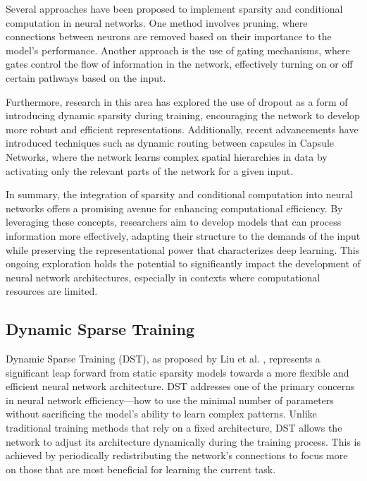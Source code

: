Several approaches have been proposed to implement sparsity and conditional computation in neural networks. One method involves pruning, where connections between neurons are removed based on their importance to the model's performance. Another approach is the use of gating mechanisms, where gates control the flow of information in the network, effectively turning on or off certain pathways based on the input.

Furthermore, research in this area has explored the use of dropout as a form of introducing dynamic sparsity during training, encouraging the network to develop more robust and efficient representations. Additionally, recent advancements have introduced techniques such as dynamic routing between capsules in Capsule Networks, where the network learns complex spatial hierarchies in data by activating only the relevant parts of the network for a given input.

In summary, the integration of sparsity and conditional computation into neural networks offers a promising avenue for enhancing computational efficiency. By leveraging these concepts, researchers aim to develop models that can process information more effectively, adapting their structure to the demands of the input while preserving the representational power that characterizes deep learning. This ongoing exploration holds the potential to significantly impact the development of neural network architectures, especially in contexts where computational resources are limited.

\subsection{Dynamic Sparse Training}

Dynamic Sparse Training (DST), as proposed by Liu et al. \cite{liu2017}, represents a significant leap forward from static sparsity models towards a more flexible and efficient neural network architecture. DST addresses one of the primary concerns in neural network efficiency—how to use the minimal number of parameters without sacrificing the model's ability to learn complex patterns. Unlike traditional training methods that rely on a fixed architecture, DST allows the network to adjust its architecture dynamically during the training process. This is achieved by periodically redistributing the network's connections to focus more on those that are most beneficial for learning the current task. 

